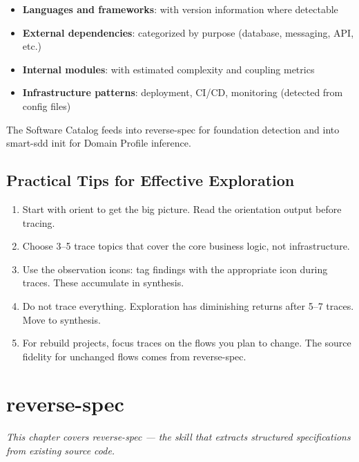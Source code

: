 \documentclass[11pt,a4paper,openright,twoside]{report}
\begin{document}
\begin{itemize}
  \item \textbf{Languages and frameworks}: with version information where detectable
  \item \textbf{External dependencies}: categorized by purpose (database, messaging, API, etc.)
  \item \textbf{Internal modules}: with estimated complexity and coupling metrics
  \item \textbf{Infrastructure patterns}: deployment, CI/CD, monitoring (detected from config files)
\end{itemize}

The Software Catalog feeds into reverse-spec for foundation detection and into smart-sdd init for Domain Profile inference.

\section{Practical Tips for Effective Exploration}

\begin{tipbox}
\begin{enumerate}
  \item Start with orient to get the big picture. Read the orientation output before tracing.
  \item Choose 3--5 trace topics that cover the core business logic, not infrastructure.
  \item Use the observation icons: tag findings with the appropriate icon during traces. These accumulate in synthesis.
  \item Do not trace everything. Exploration has diminishing returns after 5--7 traces. Move to synthesis.
  \item For rebuild projects, focus traces on the flows you plan to change. The source fidelity for unchanged flows comes from reverse-spec.
\end{enumerate}
\end{tipbox}


\chapter{reverse-spec}
\label{ch:reverse-spec}

\textit{This chapter covers reverse-spec --- the skill that extracts structured specifications from existing source code.}
\end{document}

